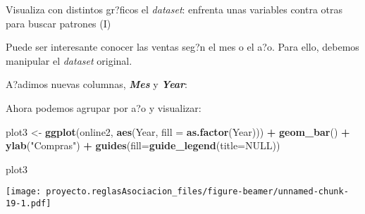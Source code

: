 \documentclass[
  ignorenonframetext,
]{beamer}
\newenvironment{Shaded}{\begin{snugshade}}{\end{snugshade}}
\newcommand{\DataTypeTok}[1]{\textcolor[rgb]{0.13,0.29,0.53}{#1}}
\newcommand{\KeywordTok}[1]{\textcolor[rgb]{0.13,0.29,0.53}{\textbf{#1}}}
\newcommand{\NormalTok}[1]{#1}
\newcommand{\OperatorTok}[1]{\textcolor[rgb]{0.81,0.36,0.00}{\textbf{#1}}}
\newcommand{\OtherTok}[1]{\textcolor[rgb]{0.56,0.35,0.01}{#1}}
\newcommand{\StringTok}[1]{\textcolor[rgb]{0.31,0.60,0.02}{#1}}
\begin{document}
\begin{frame}[fragile]{Visualiza con distintos gr?ficos el
\emph{dataset}: enfrenta unas variables contra otras para buscar
patrones (I)}
\protect\hypertarget{visualiza-con-distintos-grficos-el-dataset-enfrenta-unas-variables-contra-otras-para-buscar-patrones-i}{}

Puede ser interesante conocer las ventas seg?n el mes o el a?o. Para
ello, debemos manipular el \emph{dataset} original.

A?adimos nuevas columnas, \textbf{\emph{Mes}} y \textbf{\emph{Year}}:

\begin{Shaded}
\end{Shaded}

Ahora podemos agrupar por a?o y visualizar:

\begin{Shaded}
\begin{Highlighting}[]
\NormalTok{plot3 <-}\StringTok{ }\KeywordTok{ggplot}\NormalTok{(online2, }\KeywordTok{aes}\NormalTok{(Year, }\DataTypeTok{fill =} \KeywordTok{as.factor}\NormalTok{(Year))) }\OperatorTok{+}\StringTok{ }
\StringTok{  }\KeywordTok{geom_bar}\NormalTok{() }\OperatorTok{+}\StringTok{ }
\StringTok{  }\KeywordTok{ylab}\NormalTok{(}\StringTok{"Compras"}\NormalTok{) }\OperatorTok{+}\StringTok{ }
\StringTok{  }\KeywordTok{guides}\NormalTok{(}\DataTypeTok{fill=}\KeywordTok{guide_legend}\NormalTok{(}\DataTypeTok{title=}\OtherTok{NULL}\NormalTok{))}

\NormalTok{plot3}
\end{Highlighting}
\end{Shaded}

\texttt{[image: proyecto.reglasAsociacion\_files/figure-beamer/unnamed-chunk-19-1.pdf]}

\end{frame}
\end{document}
